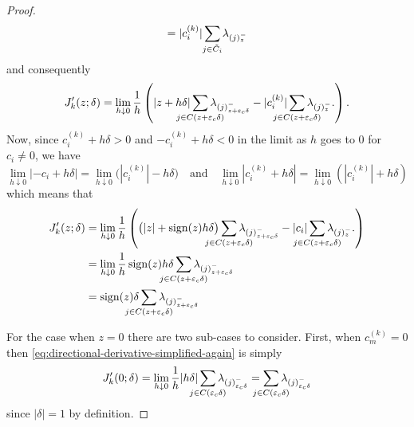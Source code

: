 \begin{proof}
\[    = |c^{(k)}_i| \smashoperator{\sum_{j \in \tilde{C}_i}} \lambda_{(j)^-_{z}}
  \]
  and consequently
  \begin{equation}
    \label{eq:directional-derivative-simplified-again}
    J'_k(z; \delta)
    = \lim_{h \downarrow 0} \frac{1}{h}
    \left(
      |z + h\delta|\smashoperator{\sum_{j \in C(z + {\varepsilon_c}\delta)}} \lambda_{(j)^-_{z + {\varepsilon_c}\delta}}
      - |c_i^{(k)}| \smashoperator{\sum_{j \in C(z + {\varepsilon_c}\delta)}} \lambda_{(j)^-_{z}}.
    \right).
  \end{equation}
  Now, since \(c_i^{(k)} + h \delta > 0\) and \(-c_i^{(k)} + h \delta < 0\) in the limit as
  \(h\) goes to \(0\) for \(c_i \neq 0\), we have
  \[
    \lim_{h\downarrow 0} |-c_i + h \delta|
    = \lim_{h\downarrow 0}\big( |c_i^{(k)}| -h \delta\big)
    \quad\text{and}\quad
    \lim_{h\downarrow 0} |c_i^{(k)} + h \delta|
    = \lim_{h\downarrow 0}(|c_i^{(k)}| + h \delta)
  \]
  which means that
  \begin{align*}
    J'_k(z; \delta)
     & = \lim_{h \downarrow 0} \frac{1}{h}
    \left(
      \big(|z| + \sign(z)h\delta\big)\smashoperator{\sum_{j \in C(z + {\varepsilon_c}\delta)}} \lambda_{(j)^-_{z + {\varepsilon_c}\delta}}
      - |c_i| \smashoperator{\sum_{j \in C(z + {\varepsilon_c}\delta)}} \lambda_{(j)^-_{z}}.
    \right)                                                                                                                  \\
     & = \lim_{h \downarrow 0} \frac{1}{h}
    \sign(z)h\delta\smashoperator{\sum_{j \in C(z + {\varepsilon_c}\delta)}} \lambda_{(j)^-_{z + {\varepsilon_c}\delta}}     \\
     & = \sign(z)\delta\smashoperator{\sum_{j \in C(z + {\varepsilon_c}\delta)}} \lambda_{(j)^-_{z + {\varepsilon_c}\delta}} \\
  \end{align*}

  For the case when \(z=0\) there are two sub-cases to consider. First, when \(c_m^{(k)} = 0\) then
  \eqref{eq:directional-derivative-simplified-again} is simply
  \begin{equation*}
    \label{eq:directional-derivative-zerocase}
    J'_k(0; \delta)
    = \lim_{h \downarrow 0} \frac{1}{h}
    |h\delta|\smashoperator{\sum_{j \in C({\varepsilon_c}\delta)}} \lambda_{(j)^-_{{\varepsilon_c}\delta}}
    = \smashoperator{\sum_{j \in C({\varepsilon_c}\delta)}} \lambda_{(j)^-_{{\varepsilon_c}\delta}}
  \end{equation*}
  since \(|\delta| = 1\) by definition.


\end{proof}
